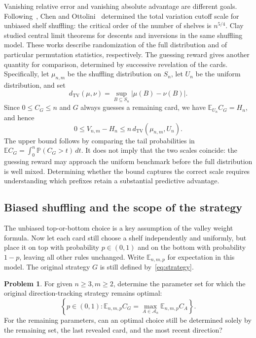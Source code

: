 \documentclass[11pt,reqno]{amsart}
\numberwithin{equation}{section}
\theoremstyle{definition}
\newtheorem{problem}{Problem}
\theoremstyle{remark}
\begin{document}
Vanishing relative error and vanishing absolute advantage are different goals. Following~\cite{DFH}, Chen and Ottolini~\cite{CO} determined the total variation cutoff scale for unbiased shelf shuffling: the critical order of the number of shelves is $n^{5/4}$. Clay~\cite{ClayStats} studied central limit theorems for descents and inversions in the same shuffling model. These works describe randomization of the full distribution and of particular permutation statistics, respectively. The guessing reward gives another quantity for comparison, determined by successive revelation of the cards. Specifically, let $\mu_{n,m}$ be the shuffling distribution on $S_n$, let $U_n$ be the uniform distribution, and set
\[
d_{\mathrm{TV}}(\mu,\nu)=\sup_{B\subseteq S_n}|\mu(B)-\nu(B)|.
\]
Since $0\le C_G\le n$ and $G$ always guesses a remaining card, we have $\mathbb E_{U_n}C_G=H_n$, and hence
\[
0\le V_{n,m}-H_n\le n\,d_{\mathrm{TV}}(\mu_{n,m},U_n).
\]
The upper bound follows by comparing the tail probabilities in $\mathbb E C_G=\int_0^n\mathbb P(C_G>t)\,dt$. It does not imply that the two scales coincide: the guessing reward may approach the uniform benchmark before the full distribution is well mixed. Determining whether the bound captures the correct scale requires understanding which prefixes retain a substantial predictive advantage.

\subsection{Biased shuffling and the scope of the strategy}
The unbiased top-or-bottom choice is a key assumption of the valley weight formula. Now let each card still choose a shelf independently and uniformly, but place it on top with probability $p\in(0,1)$ and on the bottom with probability $1-p$, leaving all other rules unchanged. Write $\mathbb E_{n,m,p}$ for expectation in this model. The original strategy $G$ is still defined by~\eqref{eq:strategy}.

\begin{problem}\label{prob:biased}
For given $n\ge3,m\ge2$, determine the parameter set for which the original direction-tracking strategy remains optimal:
\[
\left\{p\in(0,1):
\mathbb E_{n,m,p}C_G
=\max_{A\in\mathcal A_n}\mathbb E_{n,m,p}C_A\right\}.
\]
For the remaining parameters, can an optimal choice still be determined solely by the remaining set, the last revealed card, and the most recent direction?
\end{problem}
\end{document}
